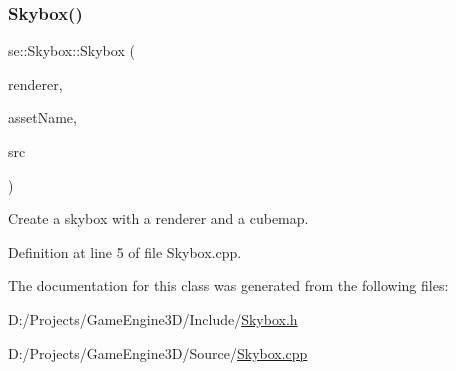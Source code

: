 \subsubsection{\texorpdfstring{Skybox()}{Skybox()}}
{\footnotesize\ttfamily se\+::\+Skybox\+::\+Skybox (\begin{DoxyParamCaption}\item[{\mbox{\hyperlink{classse_1_1_abstract_renderer}{Abstract\+Renderer}} $\ast$}]{renderer,  }\item[{const std\+::string \&}]{asset\+Name,  }\item[{const std\+::string \&}]{src }\end{DoxyParamCaption})}

Create a skybox with a renderer and a cubemap. 

Definition at line 5 of file Skybox.\+cpp.



The documentation for this class was generated from the following files\+:\begin{DoxyCompactItemize}
\item 
D\+:/\+Projects/\+Game\+Engine3\+D/\+Include/\mbox{\hyperlink{_skybox_8h}{Skybox.\+h}}\item 
D\+:/\+Projects/\+Game\+Engine3\+D/\+Source/\mbox{\hyperlink{_skybox_8cpp}{Skybox.\+cpp}}\end{DoxyCompactItemize}
